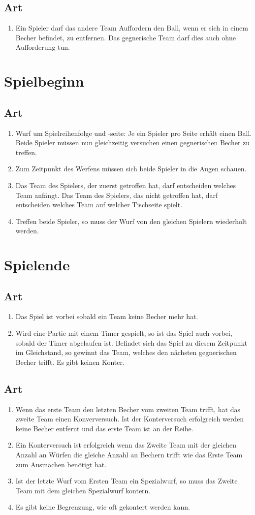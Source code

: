 \documentclass[a4paper,11pt]{scrartcl}
\newcommand{\enum}[1]{\begin{enumerate}[label=(\arabic*)]#1\end{enumerate}}
\newcommand{\art}[2]{\subsection*{#1} \enum{#2}}
\newcounter{art}
\begin{document}
    \art{Art \theart}{
        \item
            Ein Spieler darf das andere Team Auffordern den Ball, wenn er sich in einem Becher befindet, zu entfernen. Das gegnerische Team darf dies auch ohne Aufforderung tun.
    }

\section{Spielbeginn}
    \art{Art \theart}{
        \item
            Wurf um Spielreihenfolge und -seite: Je ein Spieler pro Seite erhält einen Ball. Beide Spieler müssen nun gleichzeitig versuchen einen gegnerischen Becher zu treffen.
        \item
            Zum Zeitpunkt des Werfens müssen sich beide Spieler in die Augen schauen.
        \item
            Das Team des Spielers, der zuerst getroffen hat, darf entscheiden welches Team anfängt. Das Team des Spielers, das nicht getroffen hat, darf entscheiden welches Team auf welcher Tischseite spielt.
        \item
            Treffen beide Spieler, so muss der Wurf von den gleichen Spielern wiederholt werden.
    }

\section{Spielende}
    \art{Art \theart}{
        \item
            Das Spiel ist vorbei sobald ein Team keine Becher mehr hat.
        \item
            Wird eine Partie mit einem Timer gespielt, so ist das Spiel auch vorbei, sobald der Timer abgelaufen ist. Befindet sich das Spiel zu diesem Zeitpunkt im Gleichstand, so gewinnt das Team, welches den nächsten gegnerischen Becher trifft. Es gibt keinen Konter.
    }

    \art{Art \theart}{
        \item
            Wenn das erste Team den letzten Becher vom zweiten Team trifft, hat das zweite Team einen Konverversuch. Ist der Konterversuch erfolgreich werden keine Becher entfernt und das erste Team ist an der Reihe.
        \item
            Ein Konterversuch ist erfolgreich wenn das Zweite Team mit der gleichen Anzahl an Würfen die gleiche Anzahl an Bechern trifft wie das Erste Team zum Ausmachen benötigt hat.
        \item
            Ist der letzte Wurf vom Ersten Team ein Spezialwurf, so muss das Zweite Team mit dem gleichen Spezialwurf kontern.
        \item
            Es gibt keine Begrenzung, wie oft gekontert werden kann.
    }
\end{document}
